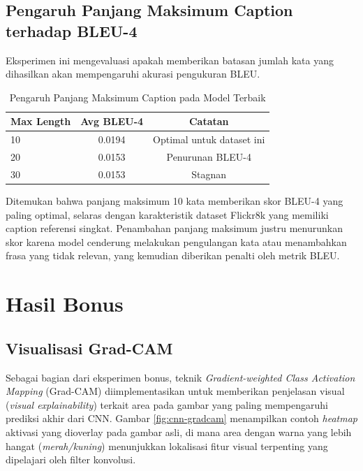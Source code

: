 \subsection{Pengaruh Panjang Maksimum Caption terhadap BLEU-4}

Eksperimen ini mengevaluasi apakah memberikan batasan jumlah kata yang dihasilkan akan mempengaruhi akurasi pengukuran BLEU.

\begin{table}[H]
	\centering
	\caption{Pengaruh Panjang Maksimum Caption pada Model Terbaik}
	\begin{tabular}{lcc}
		\toprule
		\textbf{Max Length} & \textbf{Avg BLEU-4} & \textbf{Catatan} \\
		\midrule
		10 & 0.0194 & Optimal untuk dataset ini \\
		20 & 0.0153 & Penurunan BLEU-4 \\
		30 & 0.0153 & Stagnan \\
		\bottomrule
	\end{tabular}
	\label{tab:caption-maxlen}
\end{table}

Ditemukan bahwa panjang maksimum 10 kata memberikan skor BLEU-4 yang paling optimal, selaras dengan karakteristik dataset Flickr8k yang memiliki caption referensi singkat. Penambahan panjang maksimum justru menurunkan skor karena model cenderung melakukan pengulangan kata atau menambahkan frasa yang tidak relevan, yang kemudian diberikan penalti oleh metrik BLEU.

\section{Hasil Bonus}

\subsection{Visualisasi Grad-CAM}

Sebagai bagian dari eksperimen bonus, teknik \textit{Gradient-weighted Class Activation Mapping} (Grad-CAM) diimplementasikan untuk memberikan penjelasan visual (\textit{visual explainability}) terkait area pada gambar yang paling mempengaruhi prediksi akhir dari CNN. Gambar \ref{fig:cnn-gradcam} menampilkan contoh \textit{heatmap} aktivasi yang dioverlay pada gambar asli, di mana area dengan warna yang lebih hangat (\textit{merah/kuning}) menunjukkan lokalisasi fitur visual terpenting yang dipelajari oleh filter konvolusi.

